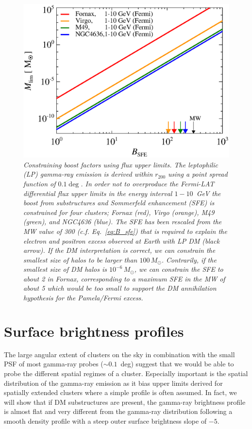 \documentclass[10pt,aps,pra,reprint,amsmath,amsfonts,amssymb,showpacs,nofootinbib,floatfix]{revtex4-1}
\newcommand{\msun}{M_\odot}
\newcommand{\rvir}{r_{200}}
\begin{document}
\begin{figure}%
 \includegraphics[width=0.99\columnwidth]{figures/LP.const.diff.v11.0.1deg.1.6T.SubMass.SF300.IR2.noMW.woGal.eps}
 \caption{\it Constraining boost factors using flux upper limits. The
   leptophilic (LP) gamma-ray emission is derived within $\rvir$ using
   a point spread function of $0.1\deg$. In order not to overproduce
   the Fermi-LAT differential flux upper limits in the energy interval
   $1-10$~GeV the boost from substructures and Sommerfeld enhancement
   (SFE) is constrained for four clusters; Fornax (red), Virgo
   (orange), M49 (green), and NGC4636 (blue). The SFE has been
   rescaled from the MW value of 300 (c.f. Eq.~\ref{eq:B_sfe}) that is
   required to explain the electron and positron excess observed at
   Earth with LP DM (black arrow). If the DM interpretation is
   correct, we can constrain the smallest size of halos to be larger
   than $100\,\msun$. Contrarily, if the smallest size of DM halos is
   $10^{-6}\,\msun$, we can constrain the SFE to about 2 in Fornax,
   corresponding to a maximum SFE in the MW of about 5 which would be
   too small to support the DM annihilation hypothesis for the
   Pamela/Fermi excess.}
 \label{fig:boost_const}
\end{figure}



\section{Surface brightness profiles}
\label{sect:spatial}

The large angular extent of clusters on the sky in combination with
the small PSF of most gamma-ray probes ($\sim 0.1$~deg) suggest that
we would be able to probe the different spatial regimes of a
cluster. Especially important is the spatial distribution of the
gamma-ray emission as it bias upper limits derived for spatially
extended clusters where a simple profile is often assumed. In fact, we
will show that if DM substructures are present, the gamma-ray
brightness profile is almost flat and very different from the
gamma-ray distribution following a smooth density profile with a steep
outer surface brightness slope of $-5$.
\end{document}
